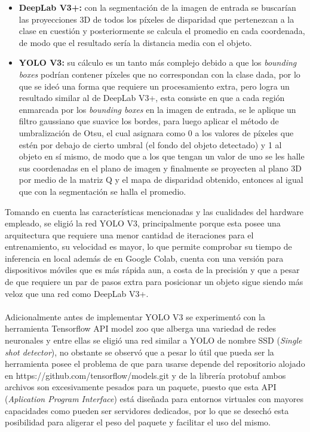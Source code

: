 \begin{itemize}
    \item \textbf{DeepLab V3+:} con la segmentación de la imagen de entrada se buscarían las proyecciones 3D de todos los píxeles de disparidad que pertenezcan a la clase en cuestión y posteriormente se calcula el promedio en cada coordenada, de modo que el resultado sería la distancia media con el objeto.
    \item \textbf{YOLO V3:} su cálculo es un tanto más complejo debido a que los \textit{bounding boxes} podrían contener píxeles que no correspondan con la clase dada, por lo que se ideó una forma que requiere un procesamiento extra, pero logra un resultado similar al de DeepLab V3+, esta consiste en que a cada región enmarcada por los \textit{bounding boxes} en la imagen de entrada, se le aplique un filtro gaussiano que suavice los bordes, para luego aplicar el método de umbralización de Otsu, el cual asignara como 0 a los valores de píxeles que estén por debajo de cierto umbral (el fondo del objeto detectado) y 1 al objeto en sí mismo, de modo que a los que tengan un valor de uno se les halle sus coordenadas en el plano de imagen y finalmente se proyecten al plano 3D por medio de la matriz Q y el mapa de disparidad obtenido, entonces al igual que con la segmentación se halla el promedio.
\end{itemize}
Tomando en cuenta las características mencionadas y las cualidades del hardware empleado, se eligió la red YOLO V3, principalmente porque esta posee una arquitectura que requiere una menor cantidad de iteraciones para el entrenamiento, su velocidad es mayor, lo que permite comprobar su tiempo de inferencia en local además de en Google Colab, cuenta con una versión para dispositivos móviles que es más rápida aun, a costa de la precisión y que a pesar de que requiere un par de pasos extra para posicionar un objeto sigue siendo más veloz que una red como DeepLab V3+.
\\
\\
Adicionalmente antes de implementar YOLO V3 se experimentó con la herramienta Tensorflow API model zoo que alberga una variedad de redes neuronales y entre ellas se eligió una red similar a YOLO de nombre SSD (\textit{Single shot detector}), no obstante se observó que a pesar lo útil que pueda ser la herramienta posee el problema de que para usarse depende del repositorio alojado en https://github.com/tensorflow/models.git y de la librería protobuf ambos archivos son excesivamente pesados para un paquete, puesto que esta API (\textit{Aplication Program Interface}) está diseñada para entornos virtuales con mayores capacidades como pueden ser servidores dedicados, por lo que se desechó esta posibilidad para aligerar el peso del paquete y facilitar el uso del mismo.
